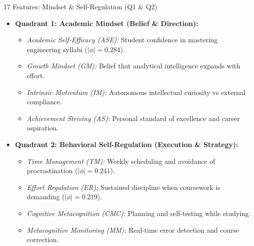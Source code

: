 \documentclass{beamer}
\begin{document}
\begin{frame}{17 Features: Mindset \& Self-Regulation (Q1 \& Q2)}
  \begin{itemize}\setlength{\itemsep}{3.5pt}\small
    \item \textbf{Quadrant 1: Academic Mindset (Belief \& Direction):}
    \begin{itemize}\setlength{\itemsep}{1.5pt}\footnotesize
      \item \textit{Academic Self-Efficacy (ASE):} Student confidence in mastering engineering syllabi ($|\phi|=0.284$).
      \item \textit{Growth Mindset (GM):} Belief that analytical intelligence expands with effort.
      \item \textit{Intrinsic Motivation (IM):} Autonomous intellectual curiosity vs external compliance.
      \item \textit{Achievement Striving (AS):} Personal standard of excellence and career aspiration.
    \end{itemize}
    \item \textbf{Quadrant 2: Behavioral Self-Regulation (Execution \& Strategy):}
    \begin{itemize}\setlength{\itemsep}{1.5pt}\footnotesize
      \item \textit{Time Management (TM):} Weekly scheduling and avoidance of procrastination ($|\phi|=0.241$).
      \item \textit{Effort Regulation (ER):} Sustained discipline when coursework is demanding ($|\phi|=0.219$).
      \item \textit{Cognitive Metacognition (CMC):} Planning and self-testing while studying.
      \item \textit{Metacognitive Monitoring (MM):} Real-time error detection and course correction.
    \end{itemize}
  \end{itemize}
\end{frame}
\end{document}

